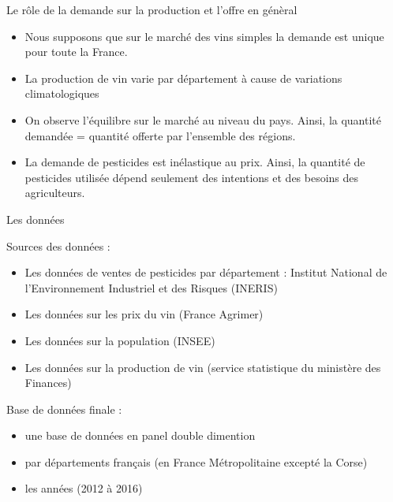 \documentclass[11pt,ignorenonframetext,]{beamer}
\providecommand{\tightlist}{%
  \setlength{\itemsep}{0pt}\setlength{\parskip}{0pt}}
\begin{document}
\begin{frame}{Le rôle de la demande sur la production et l'offre en
génèral}
\protect\hypertarget{le-role-de-la-demande-sur-la-production-et-loffre-en-general}{}

\begin{itemize}
\tightlist
\item
  Nous supposons que sur le marché des vins simples la demande est
  unique pour toute la France.
\item
  La production de vin varie par département à cause de variations
  climatologiques
\item
  On observe l'équilibre sur le marché au niveau du pays. Ainsi, la
  quantité demandée = quantité offerte par l'ensemble des régions.
\item
  La demande de pesticides est inélastique au prix. Ainsi, la quantité
  de pesticides utilisée dépend seulement des intentions et des besoins
  des agriculteurs.
\end{itemize}

\end{frame}

\begin{frame}{Les données}
\protect\hypertarget{les-donnees}{}

Sources des données :

\begin{itemize}
\tightlist
\item
  Les données de ventes de pesticides par département : Institut
  National de l'Environnement Industriel et des Risques (INERIS)
\item
  Les données sur les prix du vin (France Agrimer)
\item
  Les données sur la population (INSEE)
\item
  Les données sur la production de vin (service statistique du ministère
  des Finances)
\end{itemize}

Base de données finale :

\begin{itemize}
\tightlist
\item
  une base de données en panel double dimention
\item
  par départements français (en France Métropolitaine excepté la Corse)
\item
  les années (2012 à 2016)
\end{itemize}

\end{frame}
\end{document}
